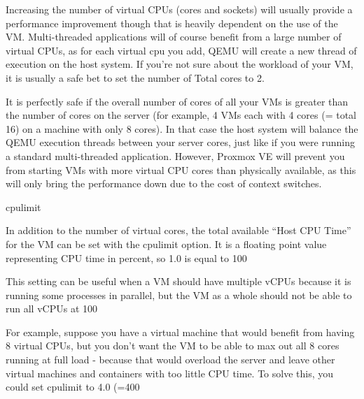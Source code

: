 Increasing the number of virtual CPUs (cores and sockets) will usually provide a performance improvement though that is heavily dependent on the use of the VM. Multi-threaded applications will of course benefit from a large number of virtual CPUs, as for each virtual cpu you add, QEMU will create a new thread of execution on the host system. If you’re not sure about the workload of your VM, it is usually a safe bet to set the number of Total cores to 2.

It is perfectly safe if the overall number of cores of all your VMs is greater than the number of cores on the server (for example, 4 VMs each with 4 cores (= total 16) on a machine with only 8 cores). In that case the host system will balance the QEMU execution threads between your server cores, just like if you were running a standard multi-threaded application. However, Proxmox VE will prevent you from starting VMs with more virtual CPU cores than physically available, as this will only bring the performance down due to the cost of context switches.

cpulimit

In addition to the number of virtual cores, the total available “Host CPU Time” for the VM can be set with the cpulimit option. It is a floating point value representing CPU time in percent, so 1.0 is equal to 100%

This setting can be useful when a VM should have multiple vCPUs because it is running some processes in parallel, but the VM as a whole should not be able to run all vCPUs at 100%

For example, suppose you have a virtual machine that would benefit from having 8 virtual CPUs, but you don’t want the VM to be able to max out all 8 cores running at full load - because that would overload the server and leave other virtual machines and containers with too little CPU time. To solve this, you could set cpulimit to 4.0 (=400%

